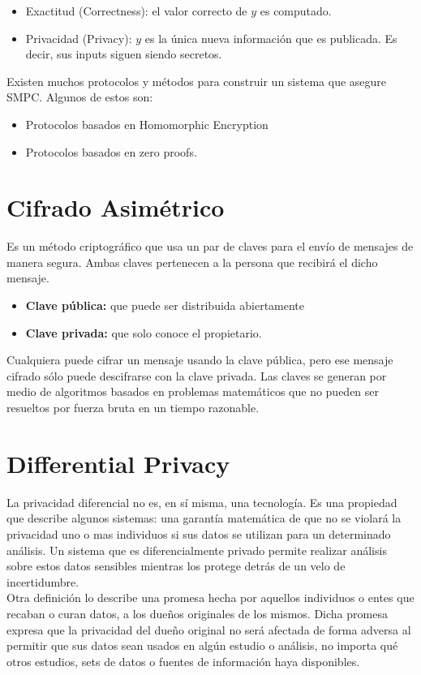 \documentclass[
11pt, %
oneside, %
spanish, %
singlespacing, %
parskip, %
headsepline, %
chapterinoneline, %
]{MastersDoctoralThesis} %
\begin{document}
\begin{itemize}
\item Exactitud (Correctness): el valor correcto de $y$ es computado.
\item Privacidad (Privacy): $y$ es la \'unica nueva informaci\'on que es publicada. Es decir, sus inputs siguen siendo secretos.
\end{itemize}

Existen muchos protocolos y m\'etodos para construir un sistema que asegure SMPC. Algunos de estos son:

\begin{itemize}
\item Protocolos basados en Homomorphic Encryption
\item Protocolos basados en zero proofs.
\end{itemize}

\section{Cifrado Asimétrico}
Es un método criptográfico que usa un par de claves para el envío de mensajes de manera segura. Ambas claves pertenecen a la persona que recibirá el dicho mensaje.
\begin{itemize}
\item \textbf{Clave pública:} que puede ser distribuida abiertamente
\item \textbf{Clave privada:} que solo conoce el propietario.
\end{itemize}
Cualquiera puede cifrar un mensaje usando la clave pública, pero ese mensaje cifrado sólo puede descifrarse con la clave privada.
Las claves se generan por medio de algoritmos basados en problemas matemáticos que no pueden ser resueltos por fuerza bruta en un tiempo razonable. 

\pagebreak

\section{Differential Privacy}
La privacidad diferencial \cite{diffpriv4} no es, en sí misma, una tecnología. Es una propiedad que describe algunos sistemas: una garantía matemática de que no se violará la privacidad uno o mas individuos si sus datos se utilizan para un determinado análisis. Un sistema que es diferencialmente privado permite realizar análisis sobre estos datos sensibles mientras los protege detrás de un velo de incertidumbre. \\
Otra definición \cite{diffpriv3} lo describe una promesa hecha por aquellos individuos o entes que recaban o curan datos, a los due\~nos originales de los mismos. Dicha promesa expresa que la privacidad del dueño original no ser\'a afectada de forma adversa al permitir que sus datos sean usados en alg\'un estudio o an\'alisis, no importa qu\'e otros estudios, sets de datos o fuentes de informaci\'on haya disponibles.
\end{document}
